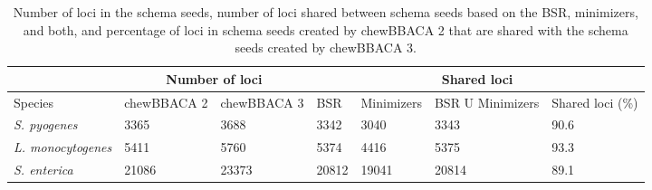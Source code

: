 \begin{table}[h!]
    \caption{Number of loci in the schema seeds, number of loci shared between schema seeds based on the \ac{BSR}, minimizers, and both, and percentage of loci in schema seeds created by chewBBACA 2 that are shared with the schema seeds created by chewBBACA 3.}
    \label{tab:ch2_tableS2}
    \centering
    \begin{tabular}{@{}lllllll@{}}
    \toprule
    \multicolumn{1}{|c|}{} & \multicolumn{2}{|c|}{Number of loci} & \multicolumn{4}{|c|}{Shared loci} \\ \midrule
    Species & chewBBACA 2 & chewBBACA 3 & BSR & Minimizers & BSR U Minimizers & Shared loci (\%) \\ \midrule
    \textit{S. pyogenes} & 3365 & 3688 & 3342 & 3040 & 3343 & 90.6 \\
    \textit{L. monocytogenes} & 5411 & 5760 & 5374 & 4416 & 5375 & 93.3 \\
    \textit{S. enterica} & 21086 & 23373 & 20812 & 19041 & 20814 & 89.1 \\
    \bottomrule
    \end{tabular}
\end{table}